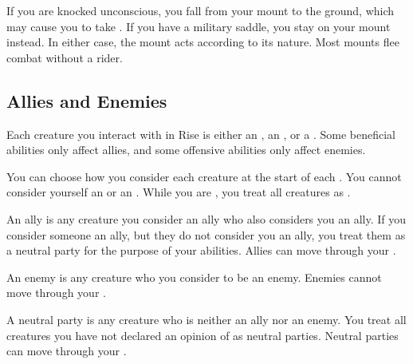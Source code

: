          If you are knocked unconscious, you fall from your mount to the ground, which may cause you to take .
        If you have a military saddle, you stay on your mount instead.
        In either case, the mount acts according to its nature.
        Most mounts flee combat without a rider.

    \subsection{Allies and Enemies}\label{Allies and Enemies}
        Each creature you interact with in Rise is either an , an , or a .
        Some beneficial abilities only affect allies, and some offensive abilities only affect enemies.

        You can choose how you consider each creature at the start of each .
        You cannot consider yourself an  or an .
        While you are \unconscious, you treat all creatures as .

         An ally is any creature you consider an ally who also considers you an ally.
        If you consider someone an ally, but they do not consider you an ally, you treat them as a neutral party for the purpose of your abilities.
        Allies can move through your .

         An enemy is any creature who you consider to be an enemy.
        Enemies cannot move through your .

         A neutral party is any creature who is neither an ally nor an enemy.
        You treat all creatures you have not declared an opinion of as neutral parties.
        Neutral parties can move through your .
